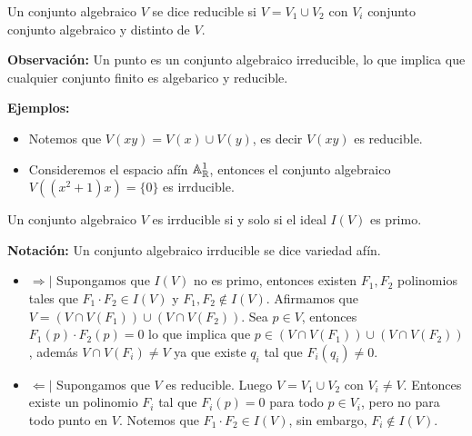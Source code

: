 \documentclass{article}
\begin{document}
\begin{dfn}
    Un conjunto algebraico $V$ se dice reducible si $V=V_{1}\cup V_{2}$ con $V_{i}$ conjunto
    conjunto algebraico y distinto de $V$.
\end{dfn}

\noindent\textbf{Observación: } Un punto es un conjunto algebraico irreducible, lo que implica que
cualquier conjunto finito es algebarico y reducible.

\noindent\textbf{Ejemplos: }
\begin{itemize}
    \item Notemos que $V(xy)=V(x)\cup V(y)$, es decir $V(xy)$ es reducible.
    \item Consideremos el espacio afín $\mathbb{A}_{\mathbb{R}}^{1}$, entonces el conjunto algebraico 
    $V((x^{2}+1)x)=\{0\}$ es irrducible.
\end{itemize}

\begin{prop}
    Un conjunto algebraico $V$ es irrducible si y solo si el ideal $I(V)$ es primo.
\end{prop}

\noindent\textbf{Notación: }Un conjunto algebraico irrducible se dice variedad afín.

\begin{dem}\hspace{1mm}
    \begin{itemize}
        \item $\Rightarrow|$ Supongamos que $I(V)$ no es primo, entonces existen $F_{1},F_{2}$ 
        polinomios tales que $F_{1}\cdot F_{2}\in I(V)$ y $F_{1},F_{2}\notin I(V)$. Afirmamos que
        $V=(V\cap V(F_{1}))\cup(V\cap V(F_{2}))$. Sea $p\in V$, entonces $F_{1}(p)\cdot F_{2}(p)=0$
        lo que implica que $p\in(V\cap V(F_{1}))\cup(V\cap V(F_{2}))$, además 
        $V\cap V(F_{i})\neq V$ ya que existe $q_{i}$ tal que $F_{i}(q_{i})\neq 0$.

        \item $\Leftarrow|$ Supongamos que $V$ es reducible. Luego $V=V_{1}\cup V_{2}$ con 
        $V_{i}\neq V$. Entonces existe un polinomio $F_{i}$ tal que $F_{i}(p)=0$ para todo 
        $p\in V_{i}$, pero no para todo punto en $V$. Notemos que $F_{1}\cdot F_{2}\in I(V)$, 
        sin embargo, $F_{i}\notin I(V)$.
    \end{itemize}
\end{dem}

\end{document}
